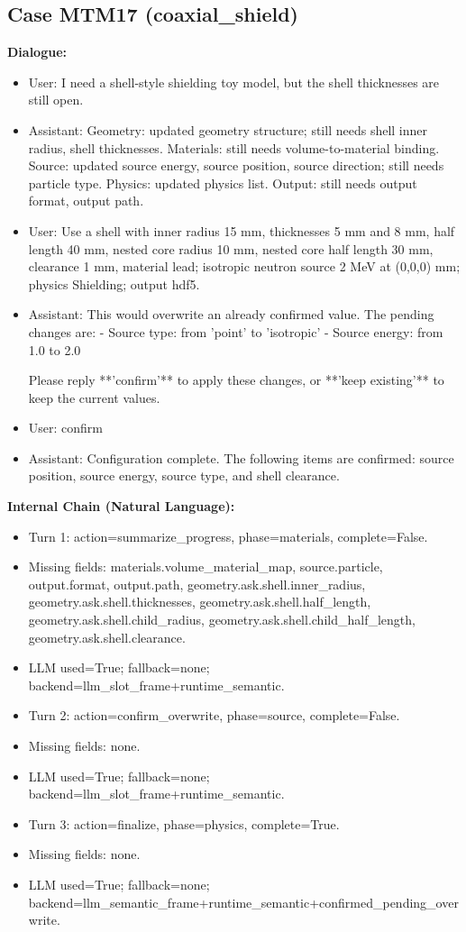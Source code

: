 \documentclass[11pt]{ctexart}
\begin{document}
\subsection{Case MTM17 (coaxial\_shield)}
\textbf{Dialogue:}
\begin{itemize}
\item User: I need a shell-style shielding toy model, but the shell thicknesses are still open.
\item Assistant: Geometry: updated geometry structure; still needs shell inner radius, shell thicknesses. Materials: still needs volume-to-material binding. Source: updated source energy, source position, source direction; still needs particle type. Physics: updated physics list. Output: still needs output format, output path.
\item User: Use a shell with inner radius 15 mm, thicknesses 5 mm and 8 mm, half length 40 mm, nested core radius 10 mm, nested core half length 30 mm, clearance 1 mm, material lead; isotropic neutron source 2 MeV at (0,0,0) mm; physics Shielding; output hdf5.
\item Assistant: This would overwrite an already confirmed value. The pending changes are:
- Source type: from 'point' to 'isotropic'
- Source energy: from 1.0 to 2.0

Please reply **'confirm'** to apply these changes, or **'keep existing'** to keep the current values.
\item User: confirm
\item Assistant: Configuration complete. The following items are confirmed: source position, source energy, source type, and shell clearance.
\end{itemize}
\textbf{Internal Chain (Natural Language):}
\begin{itemize}
\item Turn 1: action=summarize\_progress, phase=materials, complete=False.
\item Missing fields: materials.volume\_material\_map, source.particle, output.format, output.path, geometry.ask.shell.inner\_radius, geometry.ask.shell.thicknesses, geometry.ask.shell.half\_length, geometry.ask.shell.child\_radius, geometry.ask.shell.child\_half\_length, geometry.ask.shell.clearance.
\item LLM used=True; fallback=none; backend=llm\_slot\_frame+runtime\_semantic.
\item Turn 2: action=confirm\_overwrite, phase=source, complete=False.
\item Missing fields: none.
\item LLM used=True; fallback=none; backend=llm\_slot\_frame+runtime\_semantic.
\item Turn 3: action=finalize, phase=physics, complete=True.
\item Missing fields: none.
\item LLM used=True; fallback=none; backend=llm\_semantic\_frame+runtime\_semantic+confirmed\_pending\_overwrite.
\end{itemize}
\end{document}

